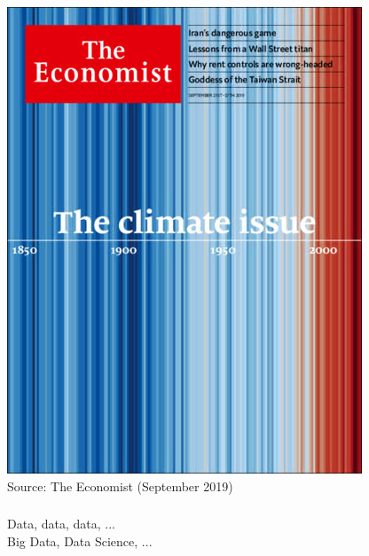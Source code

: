 \documentclass[8pt]{beamer}
\begin{document}
\begin{frame}
\frametitle{\insertsection}
\centering
\includegraphics[height = 0.8\textheight]{economist}\\
\tiny{Source: The Economist (September 2019)}
\end{frame}


\begin{frame}
\frametitle{\insertsection}
\centering
\Large Data, data, data, ... \\
	   \medskip
	   Big Data, Data Science, ...
\end{frame}

\end{document}

